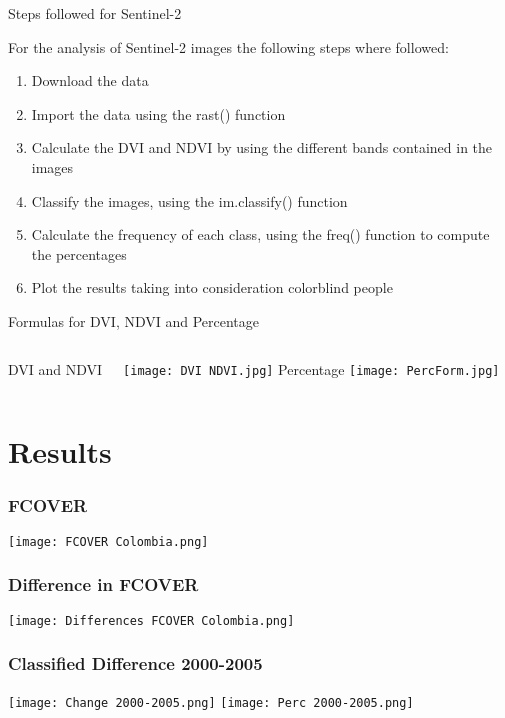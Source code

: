 \documentclass{beamer}
\begin{document}
\begin{frame}{Steps followed for Sentinel-2}

For the analysis of Sentinel-2 images the following steps where followed:


\begin{enumerate}
  \item Download the data
  \item Import the data using the rast() function
  \item Calculate the DVI and NDVI by using the different bands contained in the images
  \item Classify the images, using the im.classify() function
  \item Calculate the frequency of each class, using the freq() function to compute the percentages
  \item Plot the results taking into consideration colorblind people
  \end{enumerate}
\end{frame}

\begin{frame}{Formulas for DVI, NDVI and Percentage}
    \begin{columns}
        \centering
        DVI and NDVI
        
        \bigskip
        
        \texttt{[image: DVI NDVI.jpg]}
        \centering
        Percentage
        \texttt{[image: PercForm.jpg]}
    \end{columns}
\end{frame}

\section{Results}
\begin{frame}
\frametitle{FCOVER} 
\centering
\texttt{[image: FCOVER Colombia.png]}
\end{frame}

\begin{frame}
\frametitle{Difference in FCOVER} 
\centering
\texttt{[image: Differences FCOVER Colombia.png]}
\end{frame}

\begin{frame}
\frametitle{Classified Difference 2000-2005} 
\centering
\texttt{[image: Change 2000-2005.png]}
\texttt{[image: Perc 2000-2005.png]}
\end{frame}
\end{document}
